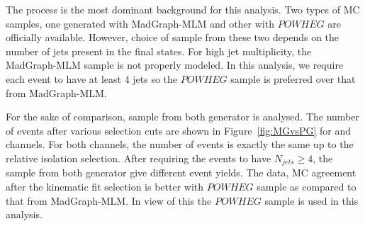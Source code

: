 
The \ttjets process is the most dominant background for this analysis. Two types of 
\ttjets MC samples, one generated with MadGraph-MLM and other with $POWHEG$ are 
officially available. However, choice of \ttjets sample from these two depends on the
number of jets present in the final states. For high jet multiplicity, the MadGraph-MLM sample is 
not properly modeled. In this analysis, we require each event to have at least 4 jets so the
$POWHEG$ \ttjets sample is preferred over that from MadGraph-MLM. 

For the sake of comparison, \ttjets sample from both generator is analysed. The number 
of events after various selection cuts are shown in Figure~\ref{fig:MGvsPG} for \mujets and 
\ejets channels. For both channels, the number of events is exactly the same up to the 
relative isolation selection. After requiring the events to have $N_{jets} \geq 4$, the
\ttjets sample from both generator give different event yields. The data, MC agreement
after the kinematic fit selection is better with $POWHEG$ \ttjets sample as compared
to that from MadGraph-MLM. In view of this the $POWHEG$ \ttjets sample is used in this
analysis.  

